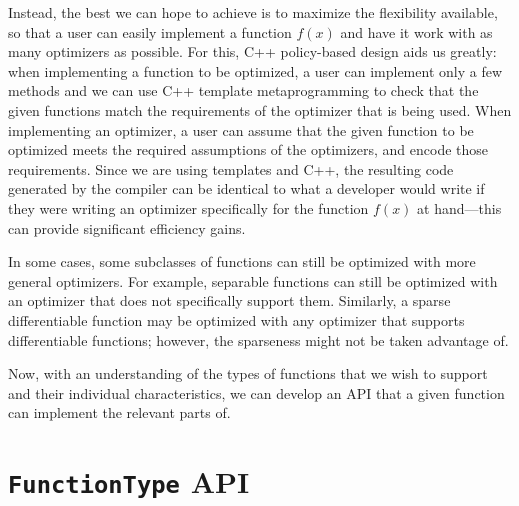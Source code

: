 \documentclass{article}
\begin{document}
Instead, the best we can hope to achieve is to maximize the flexibility
available, so that a user can easily implement a function $f(x)$ and have it
work with as many optimizers as possible.  For this, C++ policy-based design
aids us greatly: when implementing a function to be optimized, a user can
implement only a few methods and we can use C++ template metaprogramming to
check that the given functions match the requirements of the optimizer that is
being used.  When implementing an optimizer, a user can assume that the given
function to be optimized meets the required assumptions of the optimizers, and
encode those requirements.
Since we are using templates and C++, the resulting
code generated by the compiler can be identical to what a developer would write
if they were writing an optimizer specifically for the function $f(x)$ at
hand---this can provide significant efficiency gains.

In some cases, some subclasses of functions can still be optimized with more
general optimizers.  For example, separable functions can still be optimized
with an optimizer that does not specifically support them.  Similarly, a sparse
differentiable function may be optimized with any optimizer that supports
differentiable functions; however, the sparseness might not be taken advantage
of.

Now, with an understanding of the types of functions that we wish to support and
their individual characteristics, we can develop an API that a given function
can implement the relevant parts of.

\vspace*{-0.3em}
\section{{\tt FunctionType} API}
\vspace*{-0.2em}
\end{document}
